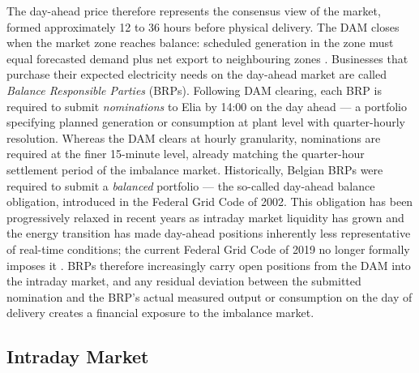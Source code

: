 The day-ahead price therefore represents the consensus view of the market, formed approximately 12 to 36 hours before physical delivery. The DAM closes when the market zone reaches balance: scheduled generation in the zone must equal forecasted demand plus net export to neighbouring zones \cite{[search: day-ahead market zone balance requirement scheduled generation forecasted demand net export]}. Businesses that purchase their expected electricity needs on the day-ahead market are called \textit{Balance Responsible Parties} (BRPs). Following DAM clearing, each BRP is required to submit \textit{nominations} to Elia by 14:00 on the day ahead — a portfolio specifying planned generation or consumption at plant level with quarter-hourly resolution. Whereas the DAM clears at hourly granularity, nominations are required at the finer 15-minute level, already matching the quarter-hour settlement period of the imbalance market. Historically, Belgian BRPs were required to submit a \textit{balanced} portfolio — the so-called day-ahead balance obligation, introduced in the Federal Grid Code of 2002. This obligation has been progressively relaxed in recent years as intraday market liquidity has grown and the energy transition has made day-ahead positions inherently less representative of real-time conditions; the current Federal Grid Code of 2019 no longer formally imposes it \cite{[search: Elia day-ahead balance obligation BRP study 2020 Belgium imbalance tariff]}. BRPs therefore increasingly carry open positions from the DAM into the intraday market, and any residual deviation between the submitted nomination and the BRP's actual measured output or consumption on the day of delivery creates a financial exposure to the imbalance market.

\subsection{Intraday Market}

